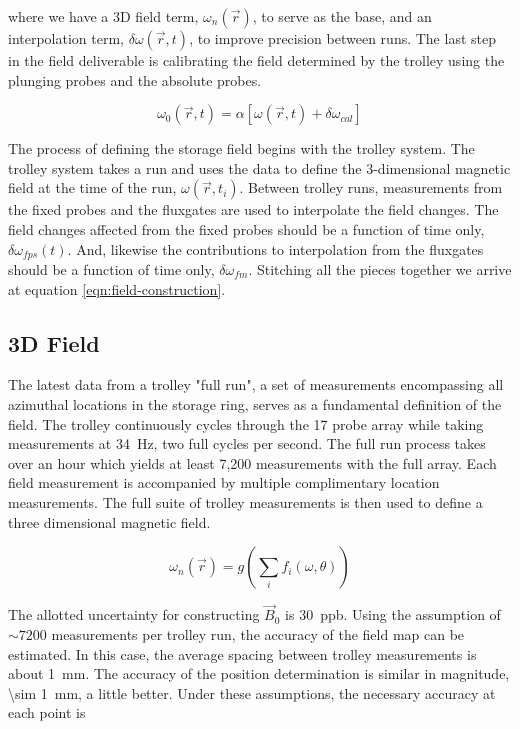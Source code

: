 \noindent
where we have a 3D field term, $\omega_{n}(\vec{r})$, to serve as the base, and an interpolation term, $\delta \omega(\vec{r}, t)$, to improve precision between runs. The last step in the field deliverable is calibrating the field determined by the trolley using the plunging probes and the absolute probes.

\begin{equation}
\label{eqn:field-calibration}
\omega_0(\vec{r}, t) = \alpha [\omega(\vec{r}, t) + \delta \omega_{cal}]
\end{equation}

The process of defining the \gmtwo storage field begins with the trolley system.  The trolley system takes a run and uses the data to define the 3-dimensional magnetic field at the time of the run, $\omega(\vec{r}, t_i)$.  Between trolley runs, measurements from the fixed probes and the fluxgates are used to interpolate the field changes.  The field changes affected from the fixed probes should be a function of time only, $\delta \omega_{fps}(t)$.  And, likewise the contributions to interpolation from the fluxgates should be a function of time only, $\delta \omega_{fm}$.  Stitching all the pieces together we arrive at equation \ref{eqn:field-construction}.

\subsection{3D Field}

The latest data from a trolley "full run", a set of measurements encompassing all azimuthal locations in the storage ring, serves as a fundamental definition of the field.  The trolley continuously cycles through the 17 probe array while taking measurements at \SI{34}{\Hz}, two full cycles per second.  The full run process takes over an hour which yields at least 7,200 measurements with the full array. Each field measurement is accompanied by multiple complimentary location measurements.  The full suite of trolley measurements is then used to define a three dimensional magnetic field.

\begin{equation}
\label{eqn:field-base}
\omega_{n}(\vec{r}) = g(\sum_{i}f_i(\omega, \theta))
\end{equation}

The allotted uncertainty for constructing $\vec{B}_0$ is \SI{30}{ppb}.  Using the assumption of $\sim 7200$ measurements per trolley run, the accuracy of the field map can be estimated.  In this case, the average spacing between trolley measurements is about \SI{1}{mm}.  The accuracy of the position determination is similar in magnitude, \SI{\sim 1}{mm}, a little better.  Under these assumptions, the necessary accuracy at each point is 

